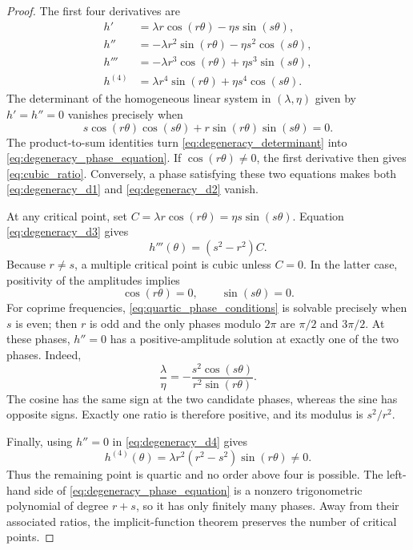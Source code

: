 \documentclass[11pt]{amsart}
\numberwithin{equation}{section}\setcounter{tocdepth}{3}\setcounter{secnumdepth}{3}
\begin{document}
\begin{proof}
The first four derivatives are
\begin{align}
 h'&=\lambda r\cos(r\theta)-\eta s\sin(s\theta),
 \label{eq:degeneracy_d1}\\
 h''&=-\lambda r^2\sin(r\theta)-\eta s^2\cos(s\theta),
 \label{eq:degeneracy_d2}\\
 h'''&=-\lambda r^3\cos(r\theta)+\eta s^3\sin(s\theta),
 \label{eq:degeneracy_d3}\\
 h^{(4)}&=\lambda r^4\sin(r\theta)+\eta s^4\cos(s\theta).
 \label{eq:degeneracy_d4}
\end{align}
The determinant of the homogeneous linear system in $(\lambda,\eta)$ given by
$h'=h''=0$ vanishes precisely when
\begin{equation}
 s\cos(r\theta)\cos(s\theta)
 +r\sin(r\theta)\sin(s\theta)=0.
 \label{eq:degeneracy_determinant}
\end{equation}
The product-to-sum identities turn \eqref{eq:degeneracy_determinant} into
\eqref{eq:degeneracy_phase_equation}.  If $\cos(r\theta)\ne0$, the first derivative
then gives \eqref{eq:cubic_ratio}.  Conversely, a phase satisfying these two equations
makes both \eqref{eq:degeneracy_d1} and \eqref{eq:degeneracy_d2} vanish.

At any critical point, set
$C=\lambda r\cos(r\theta)=\eta s\sin(s\theta)$.  Equation
\eqref{eq:degeneracy_d3} gives
\begin{equation}
 h'''(\theta)=(s^2-r^2)C.
 \label{eq:third_derivative_reduction}
\end{equation}
Because $r\ne s$, a multiple critical point is cubic unless $C=0$.  In the latter
case, positivity of the amplitudes implies
\begin{equation}
 \cos(r\theta)=0,\qquad \sin(s\theta)=0.
 \label{eq:quartic_phase_conditions}
\end{equation}
For coprime frequencies, \eqref{eq:quartic_phase_conditions} is solvable precisely when
$s$ is even; then $r$ is odd and the only phases modulo $2\pi$ are $\pi/2$ and
$3\pi/2$.  At these phases, $h''=0$ has a positive-amplitude solution at exactly one
of the two phases.  Indeed,
\begin{equation}
 \frac{\lambda}{\eta}
 =-\frac{s^2\cos(s\theta)}{r^2\sin(r\theta)}.
 \label{eq:quartic_ratio_with_sign}
\end{equation}
The cosine has the same sign at the two candidate phases, whereas the sine has opposite
signs.  Exactly one ratio is therefore positive, and its modulus is $s^2/r^2$.

Finally, using $h''=0$ in \eqref{eq:degeneracy_d4} gives
\begin{equation}
 h^{(4)}(\theta)
 =\lambda r^2(r^2-s^2)\sin(r\theta)\ne0.
 \label{eq:fourth_derivative_nonzero}
\end{equation}
Thus the remaining point is quartic and no order above four is possible.  The left-hand
side of \eqref{eq:degeneracy_phase_equation} is a nonzero trigonometric polynomial of
degree $r+s$, so it has only finitely many phases.  Away from their associated ratios,
the implicit-function theorem preserves the number of critical points.
\end{proof}
\end{document}
